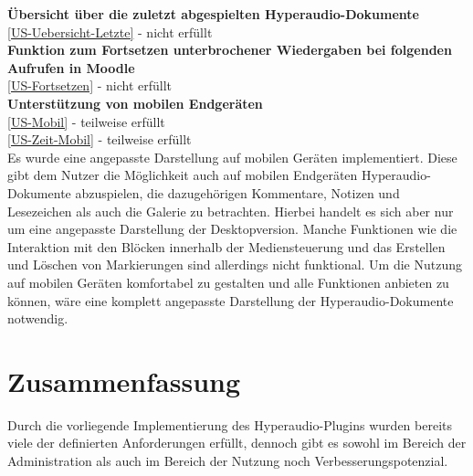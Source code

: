 \textbf{Übersicht über die zuletzt abgespielten Hyperaudio-Dokumente}\\
\ref{US-Uebersicht-Letzte} - nicht erfüllt\\


\textbf{Funktion zum Fortsetzen unterbrochener Wiedergaben bei folgenden Aufrufen in Moodle}\\
\ref{US-Fortsetzen} - nicht erfüllt\\


\textbf{Unterstützung von mobilen Endgeräten}\\
\ref{US-Mobil} - teilweise erfüllt\\
\ref{US-Zeit-Mobil}  - teilweise erfüllt\\
Es wurde eine angepasste Darstellung auf mobilen Geräten implementiert. Diese gibt dem Nutzer die Möglichkeit auch auf mobilen Endgeräten Hyperaudio-Dokumente abzuspielen, die dazugehörigen Kommentare, Notizen und Lesezeichen als auch die Galerie zu betrachten. Hierbei handelt es sich aber nur um eine angepasste Darstellung der Desktopversion. Manche Funktionen wie die Interaktion mit den Blöcken innerhalb der Mediensteuerung und das Erstellen und Löschen von Markierungen sind allerdings nicht funktional. Um die Nutzung auf mobilen Geräten komfortabel zu gestalten und alle Funktionen anbieten zu können, wäre eine komplett angepasste Darstellung der Hyperaudio-Dokumente notwendig.


\section{Zusammenfassung}

Durch die vorliegende Implementierung des Hyperaudio-Plugins wurden bereits viele der definierten Anforderungen erfüllt, dennoch gibt es sowohl im Bereich der Administration als auch im Bereich der Nutzung noch Verbesserungspotenzial.